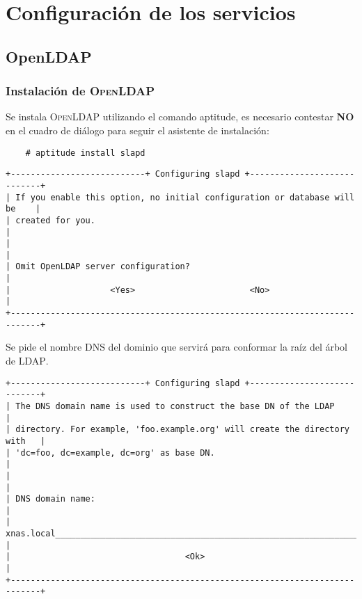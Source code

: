     \section {Configuraci\'{o}n de los servicios}

      \subsection {OpenLDAP}

          \subsubsection {Instalaci\'{o}n de \textsc{OpenLDAP}}

Se instala \textsc{OpenLDAP} utilizando el comando aptitude, es necesario contestar \textbf{NO} en el cuadro de di\'{a}logo para seguir el asistente de instalaci\'{o}n:

{
\scriptsize
\linespread{1}
\begin{verbatim}
    # aptitude install slapd
\end{verbatim}
}


{
\scriptsize
\linespread{1}
\begin{verbatim}
+---------------------------+ Configuring slapd +----------------------------+
| If you enable this option, no initial configuration or database will be    |
| created for you.                                                           |
|                                                                            |
| Omit OpenLDAP server configuration?                                        |
|                    <Yes>                       <No>                        |
+----------------------------------------------------------------------------+
\end{verbatim}
}

Se pide el nombre DNS del dominio que servir\'{a} para conformar la ra\'{i}z del \'{a}rbol de \textsc{LDAP}.

{
\scriptsize
\linespread{1}
\begin{verbatim}
+---------------------------+ Configuring slapd +----------------------------+
| The DNS domain name is used to construct the base DN of the LDAP           |
| directory. For example, 'foo.example.org' will create the directory with   |
| 'dc=foo, dc=example, dc=org' as base DN.                                   |
|                                                                            |
| DNS domain name:                                                           |
| xnas.local________________________________________________________________ |
|                                   <Ok>                                     |
+----------------------------------------------------------------------------+
\end{verbatim}
}

